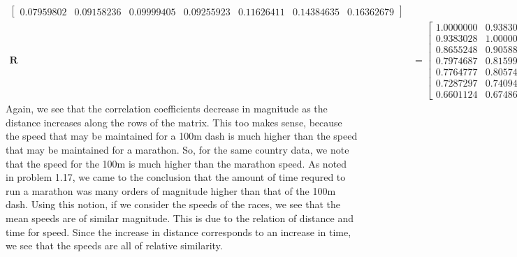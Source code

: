 \documentclass[letterpaper,10pt]{article}
\begin{document}
\begin{description}
\begin{align*}
\begin{bmatrix}
0.07959802 & 0.09158236 & 0.09999405 & 0.09255923 & 0.11626411 & 0.14384635 & 0.16362679
\end{bmatrix}\\
\textbf{R} &= \begin{bmatrix}
1.0000000 & 0.9383028 & 0.8655248 & 0.7974687 & 0.7764777 & 0.7287297 & 0.6601124\\
0.9383028 & 1.0000000 & 0.9058875 & 0.8159945 & 0.8057456 & 0.7409469 & 0.6748635\\
0.8655248 & 0.9058875 & 1.0000000 & 0.8041737 & 0.7306437 & 0.6944025 & 0.6722005\\
0.7974687 & 0.8159945 & 0.8041737 & 1.0000000 & 0.9060324 & 0.8754795 & 0.8518052\\
0.7764777 & 0.8057456 & 0.7306437 & 0.9060324 & 1.0000000 & 0.9718385 & 0.8244153\\
0.7287297 & 0.7409469 & 0.6944025 & 0.8754795 & 0.9718385 & 1.0000000 & 0.8541900\\
0.6601124 & 0.6748635 & 0.6722005 & 0.8518052 & 0.8244153 & 0.8541900 & 1.0000000
\end{bmatrix}
\end{align*}
Again, we see that the correlation coefficients decrease in magnitude as the distance increases along the rows of the matrix. This too makes sense, because the speed that may be maintained for a 100m dash is much higher than the speed that may be maintained for a marathon. So, for the same country data, we note that the speed for the 100m is much higher than the marathon speed. As noted in problem 1.17, we came to the conclusion that the amount of time requred to run a marathon was many orders of magnitude higher than that of the 100m dash. Using this notion, if we consider the speeds of the races, we see that the mean speeds are of similar magnitude. This is due to the relation of distance and time for speed. Since the increase in distance corresponds to an increase in time, we see that the speeds are all of relative similarity.
\end{description}
\end{document}
